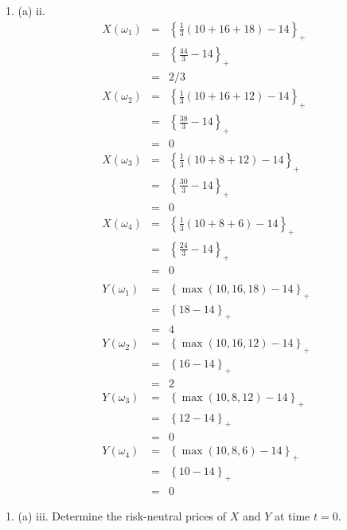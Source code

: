\documentclass[11pt,a4paper]{article}
\begin{document}
\begin{answer}{1. (a) ii.}
  \[\begin{array}{rcl}
    X(\omega_1)&=&\left\{\frac13(10+16+18)-14\right\}_+\\
    &=&\left\{\frac{44}3-14\right\}_+\\
    &=&2/3\\
    X(\omega_2)&=&\left\{\frac13(10+16+12)-14\right\}_+\\
    &=&\left\{\frac{38}3-14\right\}_+\\
    &=&0\\
    X(\omega_3)&=&\left\{\frac13(10+8+12)-14\right\}_+\\
    &=&\left\{\frac{30}3-14\right\}_+\\
    &=&0\\
    X(\omega_4)&=&\left\{\frac13(10+8+6)-14\right\}_+\\
    &=&\left\{\frac{24}3-14\right\}_+\\
    &=&0\\\\
    Y(\omega_1)&=&\left\{\max(10,16,18)-14\right\}_+\\
    &=&\left\{18-14\right\}_+\\
    &=&4\\
    Y(\omega_2)&=&\left\{\max(10,16,12)-14\right\}_+\\
    &=&\left\{16-14\right\}_+\\
    &=&2\\
    Y(\omega_3)&=&\left\{\max(10,8,12)-14\right\}_+\\
    &=&\left\{12-14\right\}_+\\
    &=&0\\
    Y(\omega_4)&=&\left\{\max(10,8,6)-14\right\}_+\\
    &=&\left\{10-14\right\}_+\\
    &=&0
  \end{array}\]
\end{answer}

\begin{question}{1. (a) iii.}
  Determine the risk-neutral prices of $X$ and $Y$ at time $t=0$.
\end{question}
\end{document}
